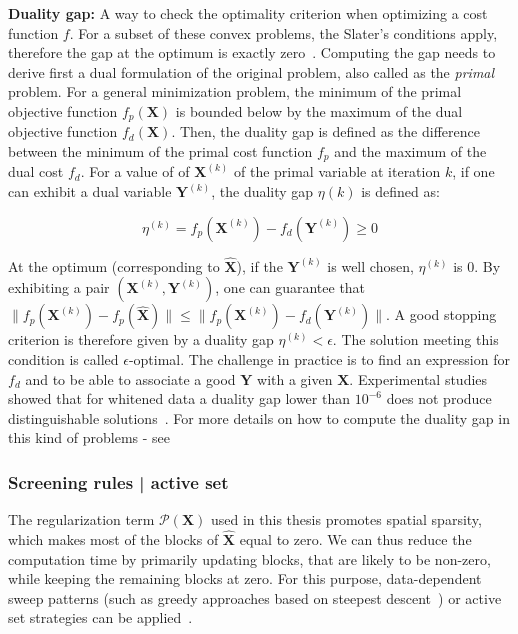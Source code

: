 \textbf{Duality gap:} A way to check the optimality criterion when optimizing a cost function $f$. For a subset of these convex problems, the Slater's conditions apply, therefore the gap at the optimum is exactly zero~\cite{Boyd_Vandenberghe04}. Computing the gap needs to derive first a dual formulation of the original problem, also called as the \textit{primal} problem. For a general minimization problem, the minimum of the primal objective function $f_p(\mathbf{X})$ is bounded below by the maximum of the dual objective function $f_d(\mathbf{X})$. Then, the duality gap is defined as the difference between the minimum of the primal cost function $f_p$ and the maximum of the dual cost $f_d$. For a value of of $\mathbf{X}^{(k)}$ of the primal variable at iteration $k$, if one can exhibit a dual variable $\mathbf{Y}^{(k)}$, the duality gap $\eta{(k)}$ is defined as:

\begin{equation}
\eta^{(k)}=f_p(\mathbf{X}^{(k)})-f_d(\mathbf{Y}^{(k)}) \geq 0
\end{equation}

At the optimum (corresponding to $\hat{\mathbf{X}}$), if the $\mathbf{Y}^{(k)}$ is well chosen, $\eta^{(k)}$ is $0$. By exhibiting a pair $(\mathbf{X}^{(k)}, \mathbf{Y}^{(k)})$, one can guarantee that $\|f_p(\mathbf{X}^{(k)}) - f_p(\hat{\mathbf{X}})\| \leq \|f_p(\mathbf{X}^{(k)})-f_d(\mathbf{Y}^{(k)})\|$. A good stopping criterion is therefore given by a duality gap $\eta^{(k)}<\epsilon$. The solution meeting this condition is called $\epsilon$-optimal. The challenge in practice is to find an expression for $f_d$ and to be able to associate a good $\mathbf{Y}$ with a given $\mathbf{X}$. Experimental studies showed that for whitened data a duality gap lower than $10^{-6}$ does not produce distinguishable solutions~\cite{Gramfort_Kowalski_Hamalainen12}. For more details on how to compute the duality gap in this kind of problems - see~\cite{bach2012optimization,Gramfort_Kowalski_Hamalainen12,strohmeier-etal:16}\\


\subsubsection*{Screening rules | active set} \label{section:active_set}
The regularization term $\mathcal{P}(\mathbf{X})$ used in this thesis promotes spatial sparsity, which makes most of the blocks of $\hat{\mathbf{X}}$ equal to zero. We can thus reduce the computation time by primarily updating blocks, that are likely to be non-zero, while keeping the remaining blocks at zero. For this purpose, data-dependent sweep patterns (such as greedy approaches based on steepest descent~\cite{li-osher:2009,wei2012doa}) or active set strategies can be applied~\cite{friedman-etal:2010,roth-etal:08}.\\

